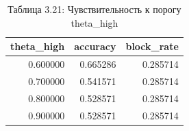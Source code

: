 \begin{table}[htbp]
\caption{Таблица 3.21: Чувствительность к порогу theta_high}
\label{tab:3_21}
\begin{tabular}{rrr}
\toprule
theta\_high & accuracy & block\_rate \\
\midrule
0.600000 & 0.665286 & 0.285714 \\
0.700000 & 0.541571 & 0.285714 \\
0.800000 & 0.528571 & 0.285714 \\
0.900000 & 0.528571 & 0.285714 \\
\bottomrule
\end{tabular}
\end{table}
